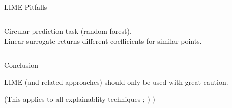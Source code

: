 \documentclass[aspectratio=169]{../latex_main/tntbeamer}  %
\begin{document}
\begin{frame}{LIME Pitfalls }
\begin{columns}
\begin{column}{0.48\textwidth}
\begin{center}
	\tiny{Circular prediction task (random forest).\\ Linear surrogate returns different coefficients for similar points.}
	
	\end{center}
\end{column}
\end{columns}

\end{frame}

\begin{frame}[c]{Conclusion}


{\huge
\alert{LIME (and related approaches) should only be used with great caution.}}

\pause

\bigskip
(This applies to all explainablity techniques ;-) )

\end{frame}


    
\end{document}

